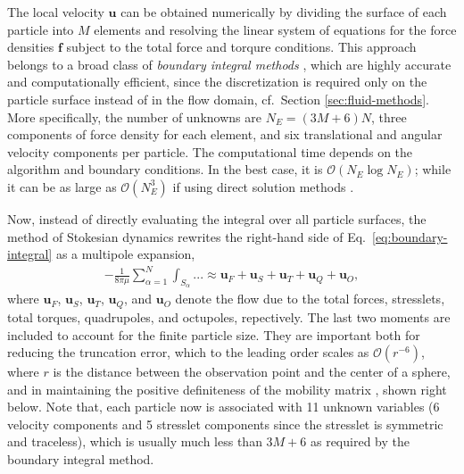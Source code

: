The local velocity $\bm{u}$ can be obtained numerically by dividing the surface of each particle into $M$ elements and resolving the linear system of equations for the force densities $\bm f$ subject to the total force and torqure conditions.
This approach belongs to a broad class of \emph{boundary integral methods} \citep{Pozrikidis}, which are highly accurate and computationally efficient, since the discretization is required only on the particle surface instead of in the flow domain, cf.\ Section \ref{sec:fluid-methods}.
More specifically, the number of unknowns are $N_E=(3M+6)N$, \ie three components of force density for each element, and six translational and angular velocity components per particle.
The computational time depends on the algorithm and boundary conditions. In the best case, it is $\mathcal{O}(N_E\log N_E)$; while it can be as large as $\mathcal{O}(N_E^3)$ if using direct solution methods \citep{graham_2018}.

Now, instead of directly evaluating the integral over all particle surfaces, the method of Stokesian dynamics \citep{durlofsky_brady_bossis_1987} rewrites the right-hand side of Eq.\ \eqref{eq:boundary-integral} as a multipole expansion, \viz
\begin{equation} \label{eq:sd-multipole}
 \begin{aligned}
  - \frac{1}{8\pi \mu} \sum_{\alpha=1}^N  \int_{S_\alpha} ... \approx \bm{u}_F + \bm{u}_S + \bm{u}_T + \bm{u}_Q + \bm{u}_O , 
 \end{aligned}
\end{equation}
where $\bm{u}_F$, $\bm{u}_S$, $\bm{u}_T$, $\bm{u}_Q$, and $\bm{u}_O$ denote the flow due to the total forces, stresslets, total torques, quadrupoles, and octupoles, repectively.
The last two moments are included to account for the finite particle size. They are important both for reducing the truncation error, which to the leading order scales as $\mathcal{O}(r^{-6})$, where $r$ is the distance between the observation point and the center of a sphere, and in maintaining the positive definiteness of the mobility matrix \citep{durlofsky_brady_bossis_1987}, shown right below.
Note that, each particle now is associated with 11 unknown variables (6 velocity components and 5 stresslet components since the stresslet is symmetric and traceless), which is usually much less than $3M+6$ as required by the boundary integral method.

